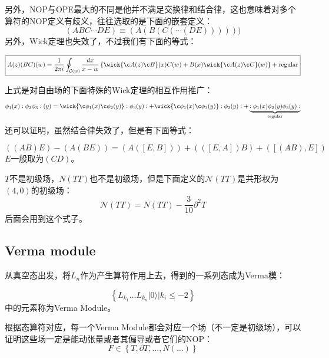另外，NOP与OPE最大的不同是他并不满足交换律和结合律，这也意味着对多个算符的NOP定义有歧义，往往选取的是下面的嵌套定义：
\begin{equation}
	(ABC\cdots DE)\equiv(A(B(C(\cdots(DE))))))
\end{equation}
另外，Wick定理也失效了，不过我们有下面的等式：
\begin{theorem}
	\begin{equation}\label{wick}
		\boxed{
			{A(z)(BC)}(w)=\frac1{2\pi i}\oint_{\mathcal{C}(w)}\frac{dx}{x-w}\left\{\wick{\c A(z)\c B}(x)C(w)+B(x)\wick{\c A(z)\c C}(w)\right\}+\text{regular}
		}
	\end{equation}
\end{theorem}
上式是对自由场的下面特殊的Wick定理的相互作用推广：
\begin{equation}
	\phi_1(x):\phi_2\phi_3:(y)=\wick{\c\phi_1(x)\c\phi_2(y)}:\phi_3(y):+\wick{\c\phi_1(x)\c\phi_3(y)}:\phi_2(y):+\underbrace{:\phi_1(x)\phi_2(y)\phi_3(y):}_{\text{regular}}
\end{equation}
还可以证明，虽然结合律失效了，但是有下面等式：
\begin{theorem}
	\begin{equation}
		((AB)E)-(A(BE))=(A([E,B]))+(([E,A])B)+([(AB),E])
	\end{equation}
	$E$一般取为$(CD)$。
\end{theorem}
$T$不是初级场，$N(TT)$也不是初级场，但是下面定义的$\mathcal{N}(TT)$是共形权为$(4,0)$的初级场：
\begin{equation}\label{33.23}
	\boxed{
		\mathcal{N}(TT)=N\left(TT\right)-\frac3{10}\partial^2T
	}
\end{equation}
后面会用到这个式子。
\subsection{Verma module}
从真空态出发，将$L_n$作为产生算符作用上去，得到的一系列态成为Verma模：
\begin{definition}
	\begin{equation}
		\boxed{
			\left\{L_{k_1}\ldots L_{k_n}|0\rangle|k_i\leq-2\right\}
		}
	\end{equation}
	中的元素称为Verma Module。
\end{definition}
根据态算符对应，每一个Verma Module都会对应一个场（不一定是初级场），可以证明这些场一定是能动张量或者其偏导或者它们的NOP：
\begin{equation}
	\boxed{
		F\in\left\{T,\partial T,\ldots,N(\ldots)\right\}
	}
\end{equation}
